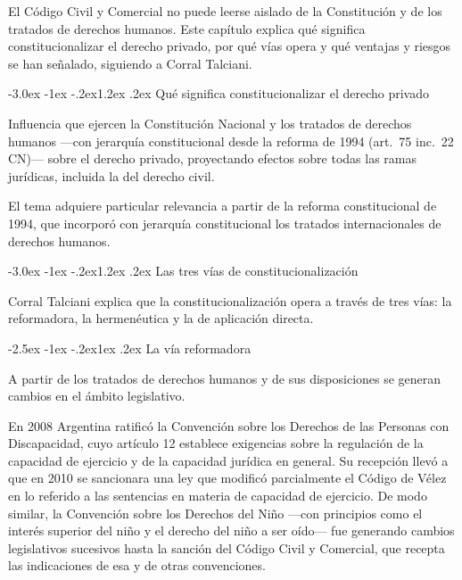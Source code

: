 \documentclass[12pt,oneside]{book}
\makeatletter
\renewcommand\section{\@startsection{section}{1}{\z@}%
  {-3.0ex \@plus -1ex \@minus -.2ex}{1.2ex \@plus .2ex}%
  {\normalfont\large\bfseries\color{acento}}}
\renewcommand\subsection{\@startsection{subsection}{2}{\z@}%
  {-2.5ex \@plus -1ex \@minus -.2ex}{1ex \@plus .2ex}%
  {\normalfont\normalsize\bfseries}}
\makeatother
\begin{document}
El Código Civil y Comercial no puede leerse aislado de la Constitución y de los tratados de derechos humanos. Este capítulo explica qué significa constitucionalizar el derecho privado, por qué vías opera y qué ventajas y riesgos se han señalado, siguiendo a Corral Talciani.

\section{Qué significa constitucionalizar el derecho privado}

\begin{definicion}
Influencia que ejercen la Constitución Nacional y los tratados de derechos humanos ---con jerarquía constitucional desde la reforma de 1994 (art.~75 inc.~22 CN)--- sobre el derecho privado, proyectando efectos sobre todas las ramas jurídicas, incluida la del derecho civil.
\end{definicion}

El tema adquiere particular relevancia a partir de la reforma constitucional de 1994, que incorporó con jerarquía constitucional los tratados internacionales de derechos humanos.

\section{Las tres vías de constitucionalización}

Corral Talciani explica que la constitucionalización opera a través de tres vías: la reformadora, la hermenéutica y la de aplicación directa.

\subsection{La vía reformadora}

A partir de los tratados de derechos humanos y de sus disposiciones se generan cambios en el ámbito legislativo.

\begin{ejemplo}
En 2008 Argentina ratificó la Convención sobre los Derechos de las Personas con Discapacidad, cuyo artículo 12 establece exigencias sobre la regulación de la capacidad de ejercicio y de la capacidad jurídica en general. Su recepción llevó a que en 2010 se sancionara una ley que modificó parcialmente el Código de Vélez en lo referido a las sentencias en materia de capacidad de ejercicio. De modo similar, la Convención sobre los Derechos del Niño ---con principios como el interés superior del niño y el derecho del niño a ser oído--- fue generando cambios legislativos sucesivos hasta la sanción del Código Civil y Comercial, que recepta las indicaciones de esa y de otras convenciones.
\end{ejemplo}
\end{document}
